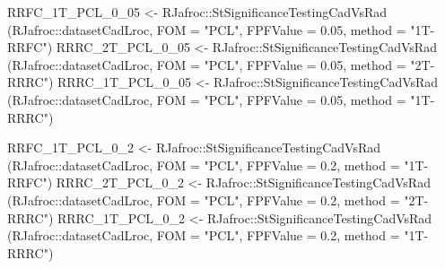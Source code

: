 \documentclass[
]{book}
\newenvironment{Shaded}{\begin{snugshade}}{\end{snugshade}}
\newcommand{\AttributeTok}[1]{\textcolor[rgb]{0.77,0.63,0.00}{#1}}
\newcommand{\FloatTok}[1]{\textcolor[rgb]{0.00,0.00,0.81}{#1}}
\newcommand{\FunctionTok}[1]{\textcolor[rgb]{0.00,0.00,0.00}{#1}}
\newcommand{\NormalTok}[1]{#1}
\newcommand{\OtherTok}[1]{\textcolor[rgb]{0.56,0.35,0.01}{#1}}
\newcommand{\SpecialCharTok}[1]{\textcolor[rgb]{0.00,0.00,0.00}{#1}}
\newcommand{\StringTok}[1]{\textcolor[rgb]{0.31,0.60,0.02}{#1}}
\begin{document}
\begin{Shaded}
\begin{Highlighting}[]
\NormalTok{RRFC\_1T\_PCL\_0\_05 }\OtherTok{\textless{}{-}}\NormalTok{ RJafroc}\SpecialCharTok{::}\FunctionTok{StSignificanceTestingCadVsRad}\NormalTok{ (RJafroc}\SpecialCharTok{::}\NormalTok{datasetCadLroc, }
\AttributeTok{FOM =} \StringTok{"PCL"}\NormalTok{, }\AttributeTok{FPFValue =} \FloatTok{0.05}\NormalTok{, }\AttributeTok{method =} \StringTok{"1T{-}RRFC"}\NormalTok{)}
\NormalTok{RRRC\_2T\_PCL\_0\_05 }\OtherTok{\textless{}{-}}\NormalTok{ RJafroc}\SpecialCharTok{::}\FunctionTok{StSignificanceTestingCadVsRad}\NormalTok{ (RJafroc}\SpecialCharTok{::}\NormalTok{datasetCadLroc, }
\AttributeTok{FOM =} \StringTok{"PCL"}\NormalTok{, }\AttributeTok{FPFValue =} \FloatTok{0.05}\NormalTok{, }\AttributeTok{method =} \StringTok{"2T{-}RRRC"}\NormalTok{)}
\NormalTok{RRRC\_1T\_PCL\_0\_05 }\OtherTok{\textless{}{-}}\NormalTok{ RJafroc}\SpecialCharTok{::}\FunctionTok{StSignificanceTestingCadVsRad}\NormalTok{ (RJafroc}\SpecialCharTok{::}\NormalTok{datasetCadLroc, }
\AttributeTok{FOM =} \StringTok{"PCL"}\NormalTok{, }\AttributeTok{FPFValue =} \FloatTok{0.05}\NormalTok{, }\AttributeTok{method =} \StringTok{"1T{-}RRRC"}\NormalTok{)}

\NormalTok{RRFC\_1T\_PCL\_0\_2 }\OtherTok{\textless{}{-}}\NormalTok{ RJafroc}\SpecialCharTok{::}\FunctionTok{StSignificanceTestingCadVsRad}\NormalTok{ (RJafroc}\SpecialCharTok{::}\NormalTok{datasetCadLroc, }
\AttributeTok{FOM =} \StringTok{"PCL"}\NormalTok{, }\AttributeTok{FPFValue =} \FloatTok{0.2}\NormalTok{, }\AttributeTok{method =} \StringTok{"1T{-}RRFC"}\NormalTok{)}
\NormalTok{RRRC\_2T\_PCL\_0\_2 }\OtherTok{\textless{}{-}}\NormalTok{ RJafroc}\SpecialCharTok{::}\FunctionTok{StSignificanceTestingCadVsRad}\NormalTok{ (RJafroc}\SpecialCharTok{::}\NormalTok{datasetCadLroc, }
\AttributeTok{FOM =} \StringTok{"PCL"}\NormalTok{, }\AttributeTok{FPFValue =} \FloatTok{0.2}\NormalTok{, }\AttributeTok{method =} \StringTok{"2T{-}RRRC"}\NormalTok{)}
\NormalTok{RRRC\_1T\_PCL\_0\_2 }\OtherTok{\textless{}{-}}\NormalTok{ RJafroc}\SpecialCharTok{::}\FunctionTok{StSignificanceTestingCadVsRad}\NormalTok{ (RJafroc}\SpecialCharTok{::}\NormalTok{datasetCadLroc, }
\AttributeTok{FOM =} \StringTok{"PCL"}\NormalTok{, }\AttributeTok{FPFValue =} \FloatTok{0.2}\NormalTok{, }\AttributeTok{method =} \StringTok{"1T{-}RRRC"}\NormalTok{)}


\end{Highlighting}
\end{Shaded}
\end{document}

